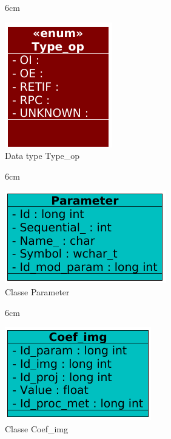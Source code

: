 \begin{figure}[!ht]{6cm}
  \caption{Data type Type\_op} \label{top}
  \centering
  \includegraphics[width=0.6\hsize]{figuras/23.png}
\end{figure}

\begin{figure}[!ht]{6cm}
  \caption{Classe Parameter} \label{par}
  \centering
  \includegraphics[width=0.7\hsize]{figuras/7.png}
\end{figure}

\begin{figure}[!ht]{6cm}
  \caption{Classe Coef\_img} \label{coefimg}
  \centering
  \includegraphics[width=0.8\hsize]{figuras/15.png}
\end{figure}

